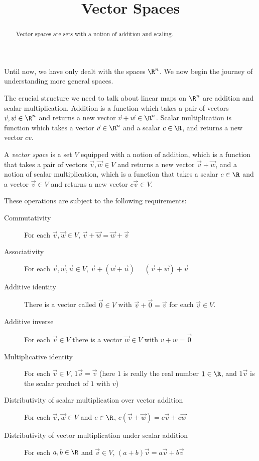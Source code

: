 \documentclass{ximera}
\title{Vector Spaces}
\begin{document}
\begin{abstract}
  Vector spaces are sets with a notion of addition and scaling.
\end{abstract}

Until now, we have only dealt with the spaces $\R^n$.  We now begin the journey of understanding more general spaces.  
	
The crucial structure we need to talk about linear maps on $\R^n$ are addition and scalar multiplication.  Addition is a function which takes a 
pair of vectors $\vec{v},\vec{w} \in \R^n$ and returns a new vector $\vec{v}+\vec{w} \in \R^n$.  Scalar multiplication is function which takes a vector $\vec{v} \in \R^n$  and 
a scalar $c \in \R$, and returns a new vector $cv$.  
	
\begin{definition}
  A \textit{vector space} is a set $V$ equipped with a notion of addition, which is a function that takes a pair of vectors $\vec{v},\vec{w} \in V$ and returns 
  a new vector $\vec{v}+\vec{w}$, and a notion of scalar multiplication, which is a function that takes a scalar $c \in \R$ and a vector $\vec{v} \in V$ and returns a 
  new vector $c\vec{v} \in V$.
		
  These operations are subject to the following requirements:
		
  \begin{description}
  \item[Commutativity] For each $\vec{v},\vec{w} \in V$, $ \vec{v} +\vec{w} = \vec{w}+\vec{v}$
  \item[Associativity] For each $\vec{v},\vec{w},\vec{u} \in V$, $\vec{v} +(\vec{w} +\vec{u}) = (\vec{v} +\vec{w}) +\vec{u}$
  \item[Additive identity] There is a vector called $\vec{0} \in V$ with $\vec{v}+\vec{0} = \vec{v}$ for each $\vec{v} \in V$.
  \item[Additive inverse] For each $\vec{v} \in V$ there is a vector $\vec{w} \in V$ with $v+w = \vec{0}$
  \item[Multiplicative identity] For each $\vec{v} \in V$, $1\vec{v}= \vec{v}$ (here $1$ is really the real number $1 \in \R$, and $1\vec{v}$ is the
    scalar product of $1$ with $v$)
  \item[Distributivity of scalar multiplication over vector addition]  For each $\vec{v},\vec{w} \in V$ and $c \in \R$, $c(\vec{v}+\vec{w}) = c\vec{v} + c\vec{w}$
  \item[Distributivity of vector  multiplication under scalar addition] For each $a,b \in \R$ and $\vec{v} \in V$, $(a+b)\vec{v} = a\vec{v}+b\vec{v}$
  \end{description}
\end{definition}
\end{document}

